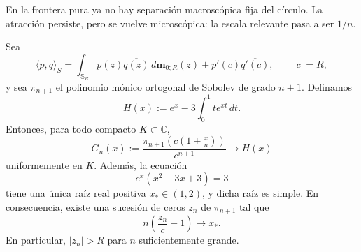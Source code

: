 En la frontera pura ya no hay separación macroscópica fija del círculo. La atracción persiste, pero se vuelve microscópica: la escala relevante pasa a ser $1/n$.

\begin{lem}\label{lem:atomo_frontera_escala_n}
	Sea
	\[
		\langle p,q\rangle_S
		=
		\int_{\mathbb S_R}p(z)\overline{q(z)}\,d\mathbf m_{0;R}(z)
		+
		p'(c)\overline{q'(c)},
		\qquad |c|=R,
	\]
	y sea $\pi_{n+1}$ el polinomio mónico ortogonal de Sobolev de grado $n+1$. Definamos
	\[
		H(x):=e^x-3\int_0^1 t e^{xt}\,dt.
	\]
	Entonces, para todo compacto $K\subset\mathbb C$,
	\[
		G_n(x):=\frac{\pi_{n+1}\!\left(c\left(1+\frac{x}{n}\right)\right)}{c^{n+1}}
		\longrightarrow H(x)
	\]
	uniformemente en $K$. Además, la ecuación
	\[
		e^x(x^2-3x+3)=3
	\]
	tiene una única raíz real positiva $x_*\in(1,2)$, y dicha raíz es simple. En consecuencia, existe una sucesión de ceros $z_n$ de $\pi_{n+1}$ tal que
	\[
		n\left(\frac{z_n}{c}-1\right)\longrightarrow x_*.
	\]
	En particular, $|z_n|>R$ para $n$ suficientemente grande.
\end{lem}

